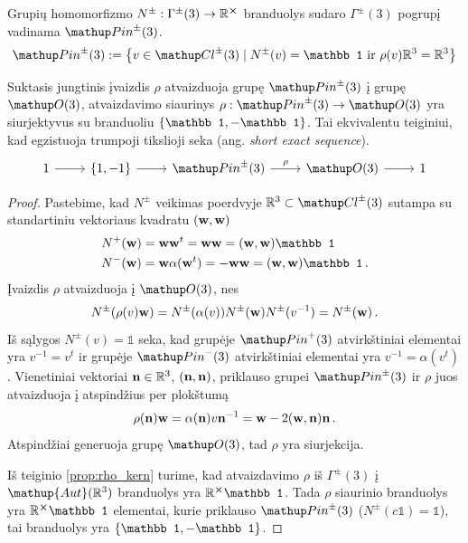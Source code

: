 \begin{definition}
	Grupių homomorfizmo $N^\pm:\Gamma^\pm(3) \to \mathbb{R}^{\cross}$
	branduolys sudaro $\Gamma^\pm(3)$ pogrupį vadinama $\pinpm$.
	\begin{equation}
		\pinpm := \qty{
			v \in \Clpm 
			\mid 
			N^\pm(v) = \mathbb1
			\text{ ir }
			\rho(v)\set R^3 = \set R^3
		}
	\end{equation}
\end{definition}



\begin{proposition}
	\label{prop:pin_sequence}
	Suktasis jungtinis įvaizdis $\rho$ atvaizduoja grupę $\pinpm$ į grupę $\Orth3$,
	atvaizdavimo siaurinys $\rho:\pinpm\to\Orth3$ yra siurjektyvus
	su branduoliu $\qty{\mathbb1,-\mathbb1}$.
	Tai ekvivalentu teiginiui, kad egzistuoja trumpoji tikslioji seka
	(ang. \emph{short exact sequence}).
	\begin{equation}
		\begin{tikzcd}
			1 \arrow[r] &\{1,-1\} \arrow[r]	&\pinpm \arrow[r, "\rho"] &\Orth3 \arrow[r] &1
		\end{tikzcd}
	\end{equation}
\end{proposition}
\begin{proof}
	Pastebime, kad $N^\pm$ veikimas poerdvyje $\set R^3 \subset \Clpm$
	sutampa su standartiniu vektoriaus kvadratu $(\vb w, \vb w)$
	\begin{align}
		N^+ (\vb w) &= \vb w {\vb w}^t 
		= \vb w \vb w = (\vb w,\vb w)\mathbb1
		\\
		N^- (\vb w) &= \vb w \alpha({\vb w}^t) 
		= -\vb w \vb w = (\vb w,\vb w)\mathbb1
		\,.
	\end{align}
	Įvaizdis $\rho$ atvaizduoja į $\Orth3$, nes
	\begin{equation}
		N^\pm(\rho(v)\vb w)
		= N^\pm(\alpha(v))  N^\pm(\vb w)  N^\pm(v^{-1}) 
		= N^\pm(\vb w)
		\,.
	\end{equation}
	Iš sąlygos $N^\pm(v) = \mathbb1$ seka,
	kad grupėje $\pinp$ atvirkštiniai elementai yra $v^{-1} = v^t$
	ir grupėje $\pinm$ atvirkštiniai elementai yra $v^{-1} = \alpha(v^t)$.
	Vienetiniai vektoriai $\vb n \in \mathbb{R}^3$, $(\vb n,\vb n)$, priklauso grupei $\pinpm$
	ir $\rho$ juos atvaizduoja į atspindžius per plokštumą
	\begin{equation}
		\rho(\vb n)\vb w = \alpha(\vb n) v \vb n^{-1} = \vb w - 2 (\vb w,\vb n)\vb n
		\,.
	\end{equation}
	Atspindžiai generuoja grupę $\Orth3$,
	tad $\rho$ yra siurjekcija.

	Iš teiginio \ref{prop:rho_kern} turime, kad atvaizdavimo 
	$\rho$ iš $\Gamma^\pm(3)$ į $\mathup{Aut}(\set R^3)$
	branduolys yra $\set R^{\cross} \mathbb1$.
	Tada $\rho$ siaurinio branduolys yra $\set R^{\cross} \mathbb1$
	elementai, kurie priklauso $\pinpm$ ($N^\pm(c\mathbb1) = \mathbb1$),
	tai branduolys yra $\qty{\mathbb1,-\mathbb1}$.
\end{proof}

